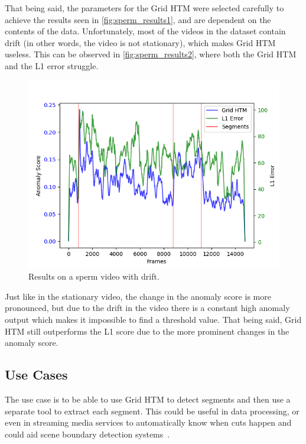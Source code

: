 \par
That being said, the parameters for the Grid HTM were selected carefully to achieve the results seen in \autoref{fig:sperm_results1}, and are dependent on the contents of the data. Unfortunately, most of the videos in the dataset contain drift (in other words, the video is not stationary), which makes Grid HTM useless. This can be observed in \autoref{fig:sperm_results2}, where both the Grid HTM and the L1 error struggle.
\begin{figure}[H]
    \centering
    \includegraphics[width=\textwidth]{resources/experiments/sperm/sperm_result2.png}
    \caption{Results on a sperm video with drift.}
    \label{fig:sperm_results2}
\end{figure}
Just like in the stationary video, the change in the anomaly score is more pronounced, but due to the drift in the video there is a constant high anomaly output which makes it impossible to find a threshold value. That being said, Grid HTM still outperforms the L1 score due to the more prominent changes in the anomaly score.
\subsection{Use Cases}
The use case is to be able to use Grid HTM to detect segments and then use a separate tool to extract each segment. This could be useful in data processing, or even in streaming media services to automatically know when cuts happen and could aid scene boundary detection systems~\cite{scene_boundary_detection}.
